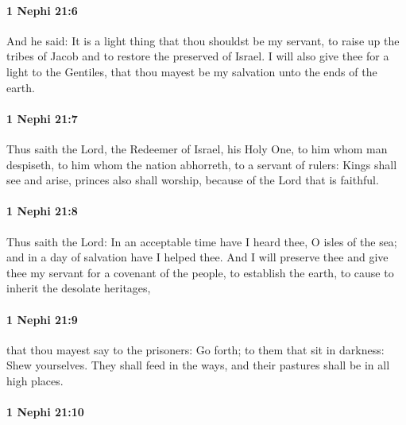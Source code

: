 		\paragraph{1 Nephi 21:6} %
			\label{1NEPHI-21-6}

			And he said:
			It is a light thing
			that thou shouldst be my servant,
			to raise up the tribes of Jacob
			and to restore the preserved of Israel.
			I will also give thee for a light to the Gentiles,
			that thou mayest be my salvation unto the ends of the earth.

		\paragraph{1 Nephi 21:7} %
			\label{1NEPHI-21-7}

			Thus saith the Lord, the Redeemer of Israel, his Holy One,
			to him whom man despiseth,
			to him whom the nation abhorreth,
			to a servant of rulers:
			Kings shall see and arise,
			princes also shall worship,
			because of the Lord that is faithful.

		\paragraph{1 Nephi 21:8} %
			\label{1NEPHI-21-8}

			Thus saith the Lord:
			In an acceptable time have I heard thee, O isles of the sea;
			and in a day of salvation have I helped thee.
			And I will preserve thee and give thee my servant
			for a covenant of the people,
			to establish the earth,
			to cause to inherit the desolate heritages,

		\paragraph{1 Nephi 21:9} %
			\label{1NEPHI-21-9}

			that thou mayest say to the prisoners:
			Go forth;
			to them that sit in darkness:
			Shew yourselves.
			They shall feed in the ways,
			and their pastures shall be in all high places.

		\paragraph{1 Nephi 21:10} %
			\label{1NEPHI-21-10}

